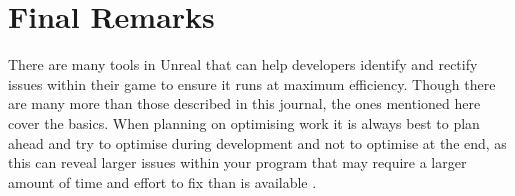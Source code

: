 \documentclass{scrartcl}
\begin{document}
\section{Final Remarks}
There are many tools in Unreal that can help developers identify and rectify issues within their game to ensure it runs at maximum efficiency. Though there are many more than those described in this journal, the ones mentioned here cover the basics. When planning on optimising work it is always best to plan ahead and try to optimise during development and not to optimise at the end, as this can reveal larger issues within your program that may require a larger amount of time and effort to fix than is available \cite{UEPerformance}.
	
	
	
	
	
	
\end{document}
